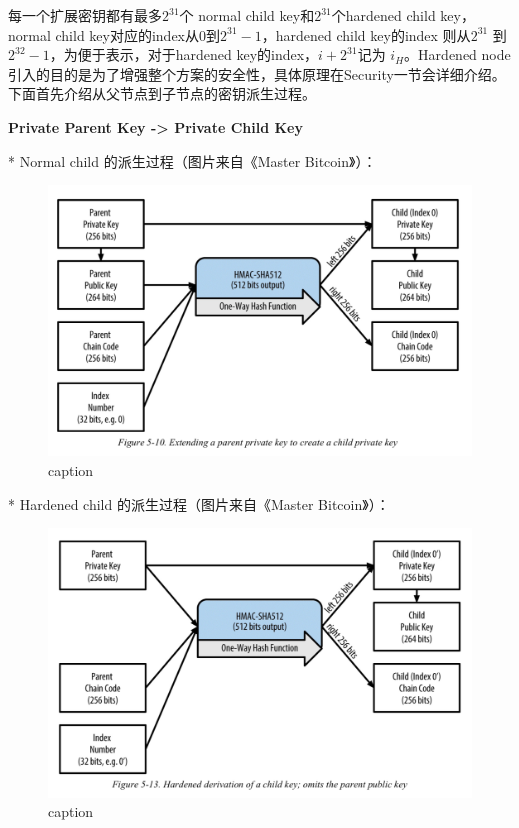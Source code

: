  每一个扩展密钥都有最多$2^{31}$个 normal child key和$2^{31}$个hardened child key， normal child key对应的index从0到$2^{31}-1$，hardened child key的index 则从$2^{31}$ 到$2^{32}-1$，为便于表示，对于hardened key的index，$i+2^{31}$记为 $i_H$。Hardened node引入的目的是为了增强整个方案的安全性，具体原理在Security一节会详细介绍。下面首先介绍从父节点到子节点的密钥派生过程。


\textbf{Private Parent Key -> Private Child Key}
 
* Normal child 的派生过程（图片来自《Master Bitcoin》）：

\begin{figure}[h]
\centering
\includegraphics[width=\textwidth]{./CKDpriv.png}
\caption{caption}\label{fig-parsesig}
\end{figure}

* Hardened child 的派生过程（图片来自《Master Bitcoin》）：

\begin{figure}[h]
\centering
\includegraphics[width=\textwidth]{./CKDpriv2.png}
\caption{caption}\label{fig-parsesig}
\end{figure}

